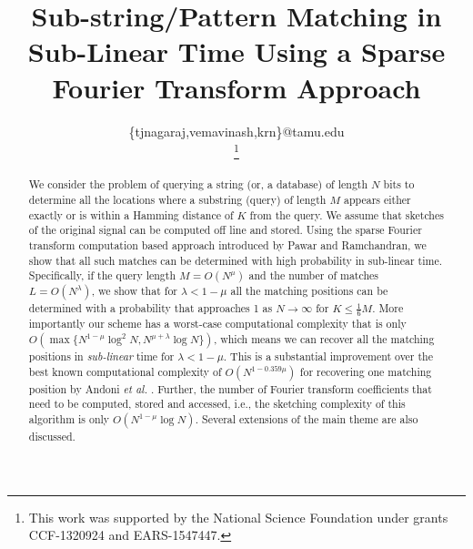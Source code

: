 \documentclass[journal,11pt,draftcls,onecolumn]{IEEEtran}  %
\title{\LARGE \bf
Sub-string/Pattern Matching in Sub-Linear Time Using a Sparse Fourier Transform Approach
}
\author{\IEEEauthorblockN{Nagaraj T. Janakiraman, Avinash Vem, Krishna R. Narayanan \\}
\IEEEauthorblockA{Department of Electrical \& Comp. Engg., Texas A\&M University, College Station, TX, U.S.A\\}
\{tjnagaraj,vemavinash,krn\}@tamu.edu\\
\thanks{This work was supported by the National Science Foundation under grants CCF-1320924 and EARS-1547447.}
}
\begin{document}
\maketitle
\thispagestyle{empty}
\pagestyle{empty}

\begin{abstract}
	We consider the problem of querying a string (or, a database) of length $N$ bits to determine all the locations where a substring (query) of length $M$ appears either exactly or is within a Hamming distance of $K$ from the query. We assume that sketches of the original signal can be computed off line and stored. Using the sparse Fourier transform computation based approach introduced by Pawar and Ramchandran, we show that all such matches can be determined with high probability in sub-linear time. Specifically, if the query length $M = O(N^\mu)$ and the number of matches $L=O(N^\lambda)$, we show that for $\lambda < 1-\mu$ all the matching positions can be determined with a probability that approaches 1 as $N \rightarrow \infty$ for $K \leq \frac{1}{6}M$. More importantly our scheme has a worst-case computational complexity that is only $O\left(\max\{N^{1-\mu}\log^2 N, N^{\mu+\lambda}\log N \}\right)$, which means we can recover all the matching positions in {\it sub-linear} time for $\lambda<1-\mu$. This is a substantial improvement over the best known computational complexity of $O\left(N^{1-0.359 \mu} \right)$ for recovering one matching position by Andoni {\em et al.} \cite{andoni2013shift}. Further, the number of Fourier transform coefficients that need to be computed, stored and accessed, i.e., the sketching complexity of this algorithm is only $O\left(N^{1-\mu}\log N\right)$. Several extensions of the main theme are also discussed.
\end{abstract}








\end{document}
